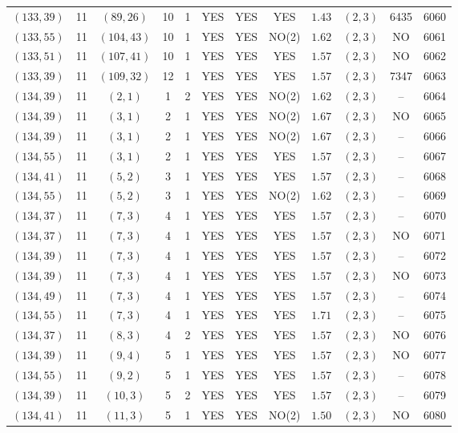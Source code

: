 \begin{longtable}{|c|c|c|c|c|c|c|c|c|c|c|c|}
$(133,39)$ & 11 & $(89,26)$ & 10 & 1 & YES & YES & YES & $1.43$ & $(2,3)$ & 6435 & 6060\\
$(133,55)$ & 11 & $(104,43)$ & 10 & 1 & YES & YES & NO(2) & $1.62$ & $(2,3)$ & NO & 6061\\
$(133,51)$ & 11 & $(107,41)$ & 10 & 1 & YES & YES & YES & $1.57$ & $(2,3)$ & NO & 6062\\
$(133,39)$ & 11 & $(109,32)$ & 12 & 1 & YES & YES & YES & $1.57$ & $(2,3)$ & 7347 & 6063\\
$(134,39)$ & 11 & $(2,1)$ & 1 & 2 & YES & YES & NO(2) & $1.62$ & $(2,3)$ & -- & 6064\\
$(134,39)$ & 11 & $(3,1)$ & 2 & 1 & YES & YES & NO(2) & $1.67$ & $(2,3)$ & NO & 6065\\
$(134,39)$ & 11 & $(3,1)$ & 2 & 1 & YES & YES & NO(2) & $1.67$ & $(2,3)$ & -- & 6066\\
$(134,55)$ & 11 & $(3,1)$ & 2 & 1 & YES & YES & YES & $1.57$ & $(2,3)$ & -- & 6067\\
$(134,41)$ & 11 & $(5,2)$ & 3 & 1 & YES & YES & YES & $1.57$ & $(2,3)$ & -- & 6068\\
$(134,55)$ & 11 & $(5,2)$ & 3 & 1 & YES & YES & NO(2) & $1.62$ & $(2,3)$ & -- & 6069\\
$(134,37)$ & 11 & $(7,3)$ & 4 & 1 & YES & YES & YES & $1.57$ & $(2,3)$ & -- & 6070\\
$(134,37)$ & 11 & $(7,3)$ & 4 & 1 & YES & YES & YES & $1.57$ & $(2,3)$ & NO & 6071\\
$(134,39)$ & 11 & $(7,3)$ & 4 & 1 & YES & YES & YES & $1.57$ & $(2,3)$ & -- & 6072\\
$(134,39)$ & 11 & $(7,3)$ & 4 & 1 & YES & YES & YES & $1.57$ & $(2,3)$ & NO & 6073\\
$(134,49)$ & 11 & $(7,3)$ & 4 & 1 & YES & YES & YES & $1.57$ & $(2,3)$ & -- & 6074\\
$(134,55)$ & 11 & $(7,3)$ & 4 & 1 & YES & YES & YES & $1.71$ & $(2,3)$ & -- & 6075\\
$(134,37)$ & 11 & $(8,3)$ & 4 & 2 & YES & YES & YES & $1.57$ & $(2,3)$ & NO & 6076\\
$(134,39)$ & 11 & $(9,4)$ & 5 & 1 & YES & YES & YES & $1.57$ & $(2,3)$ & NO & 6077\\
$(134,55)$ & 11 & $(9,2)$ & 5 & 1 & YES & YES & YES & $1.57$ & $(2,3)$ & -- & 6078\\
$(134,39)$ & 11 & $(10,3)$ & 5 & 2 & YES & YES & YES & $1.57$ & $(2,3)$ & -- & 6079\\
$(134,41)$ & 11 & $(11,3)$ & 5 & 1 & YES & YES & NO(2) & $1.50$ & $(2,3)$ & NO & 6080\\

\end{longtable}
